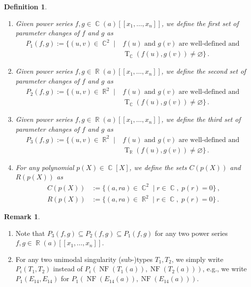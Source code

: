 \documentclass[noend]{amsproc}
\newtheorem{defn}[theorem]{Definition}
\theoremstyle{definition}
\newtheorem{remark}[theorem]{Remark}
\newcommand{\NF}[1]{\operatorname{NF}(#1)}
\DeclareMathOperator{\R}{\mathbb{R}}
\DeclareMathOperator{\C}{\mathbb{C}}
\DeclareMathOperator{\T}{T}
\begin{document}
\begin{defn}
\phantom{X}\hfill
\begin{enumerate}
\item
Given power series $f,g \in \C(a)[[x_1,\ldots,x_n]]$, we define the
first set of parameter changes of $f$ and $g$ as
\begin{align*}
P_1(f, g)
:= \{ (u, v) \in \C^2 \mid
&f(u) \text{ and } g(v) \text{ are well-defined and } \\
&\T_{\C}(f(u), g(v)) \neq \varnothing \} \,.
\end{align*}

\item
Given power series $f,g \in \R(a)[[x_1,\ldots,x_n]]$, we define the
second set of parameter changes of $f$ and $g$ as
\begin{align*}
P_2(f, g)
:= \{ (u, v) \in \R^2 \mid
&f(u) \text{ and } g(v) \text{ are well-defined and } \\
&\T_{\C}(f(u), g(v)) \neq \varnothing \} \,.
\end{align*}

\item
Given power series $f,g \in \R(a)[[x_1,\ldots,x_n]]$, we define the
third set of parameter changes of $f$ and $g$ as
\begin{align*}
P_3(f, g)
:= \{ (u, v) \in \R^2 \mid
&f(u) \text{ and } g(v) \text{ are well-defined and } \\
&\T_{\R}(f(u), g(v)) \neq \varnothing \} \,.
\end{align*}

\item
For any polynomial $p(X) \in \C[X]$, we define the sets $C(p(X))$ and $R(p(X))$
as
\begin{align*}
C(p(X)) &:= \{ (a, ra) \in \C^2 \mid r \in \C, \; p(r) = 0 \} \,, \\
R(p(X)) &:= \{ (a, ra) \in \R^2 \mid r \in \C, \; p(r) = 0 \} \,.
\end{align*}
\end{enumerate}
\end{defn}

\begin{remark}
\phantom{X}\hfill
\begin{enumerate}
\item
Note that $P_3(f, g) \subseteq P_2(f, g) \subseteq P_1(f, g)$ for any two power
series $f,g \in \R(a)[[x_1,\ldots,x_n]]$.

\item
For any two unimodal singularity (sub-)types $T_1, T_2$, we simply write
$P_i(T_1,T_2)$ instead of $P_i(\NF{T_1(a)}, \NF{T_2(a)})$, e.g., we write
$P_1(E_{14}, E_{14})$ for $P_1(\NF{E_{14}(a)}, \NF{E_{14}(a)})$.
\end{enumerate}
\end{remark}
\end{document}
